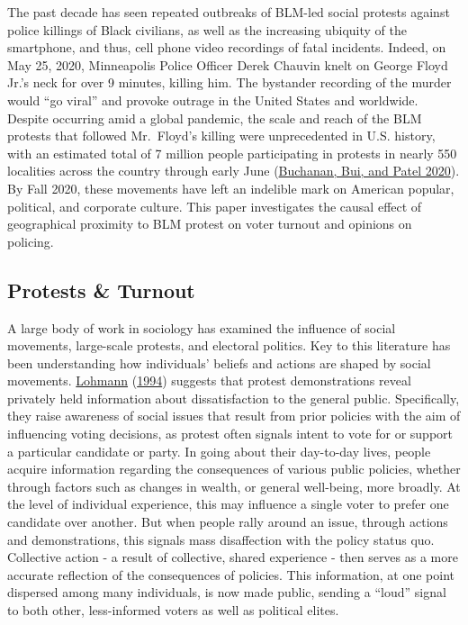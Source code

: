 \documentclass[
  12pt,
]{article}
\begin{document}
The past decade has seen repeated outbreaks of BLM-led social protests against police killings of Black civilians, as well as the increasing ubiquity of the smartphone, and thus, cell phone video recordings of fatal incidents. Indeed, on May 25, 2020, Minneapolis Police Officer Derek Chauvin knelt on George Floyd Jr.'s neck for over 9 minutes, killing him. The bystander recording of the murder would ``go viral'' and provoke outrage in the United States and worldwide. Despite occurring amid a global pandemic, the scale and reach of the BLM protests that followed Mr.~Floyd's killing were unprecedented in U.S. history, with an estimated total of 7 million people participating in protests in nearly 550 localities across the country through early June (\protect\hyperlink{ref-Buchanan2020}{Buchanan, Bui, and Patel 2020}).
By Fall 2020, these movements have left an indelible mark on American popular, political, and corporate culture. This paper investigates the causal effect of geographical proximity to BLM protest on voter turnout and opinions on policing.

\hypertarget{protests-turnout}{%
\subsection*{Protests \& Turnout}\label{protests-turnout}}

A large body of work in sociology has examined the influence of social movements, large-scale protests, and electoral politics. Key to this literature has been understanding how individuals' beliefs and actions are shaped by social movements. \protect\hyperlink{ref-Lohmann1994}{Lohmann} (\protect\hyperlink{ref-Lohmann1994}{1994}) suggests that protest demonstrations reveal privately held information about dissatisfaction to the general public. Specifically, they raise awareness of social issues that result from prior policies with the aim of influencing voting decisions, as protest often signals intent to vote for or support a particular candidate or party. In going about their day-to-day lives, people acquire information regarding the consequences of various public policies, whether through factors such as changes in wealth, or general well-being, more broadly. At the level of individual experience, this may influence a single voter to prefer one candidate over another. But when people rally around an issue, through actions and demonstrations, this signals mass disaffection with the policy status quo. Collective action - a result of collective, shared experience - then serves as a more accurate reflection of the consequences of policies. This information, at one point dispersed among many individuals, is now made public, sending a ``loud'' signal to both other, less-informed voters as well as political elites.
\end{document}
